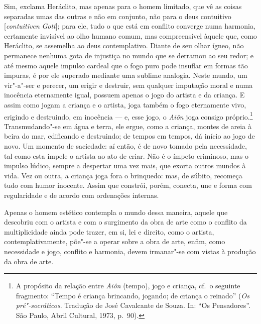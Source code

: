 Sim, exclama Heráclito, mas apenas para o homem limitado, que vê as coisas
separadas umas das outras e não em conjunto, não para o deus contuitivo
[\textit{contuitiven} \textit{Gott}]; para ele, tudo o que está em conflito
converge numa harmonia, certamente invisível ao olho humano comum, mas
compreensível àquele que, como Heráclito, se assemelha ao deus contemplativo.
Diante de seu olhar ígneo, não permanece nenhuma gota de injustiça no mundo
que se derramou ao seu redor; e até mesmo aquele impulso cardeal que o fogo
puro pode insuflar em formas tão impuras, é por ele superado mediante uma
sublime analogia. Neste mundo, um vir"-a"-ser e perecer, um erigir e
destruir, sem qualquer imputação moral e numa inocência eternamente igual,
possuem apenas o jogo do artista e da criança. E assim como jogam a criança e
o artista, joga também o fogo eternamente vivo, erigindo e destruindo, em
inocência --- e, esse jogo, o \textit{Aiôn} joga consigo próprio.\footnote{A propósito 
da relação entre \textit{Aiôn} (tempo), jogo e criança, cf.~o seguinte fragmento:
 ``Tempo é criança brincando, jogando; de criança o reinado'' (\textit
 {Os pré"-socráticos}. Tradução de José Cavalcante de Souza. In: ``Os
 Pensadores''. São Paulo, Abril Cultural, 1973, p.~90).} Transmudando"-se em
 água e terra, ele ergue, como a criança, montes de areia à beira do mar,
 edificando e destruindo; de tempos em tempos, dá início ao jogo de novo. Um
 momento de saciedade: aí então, é de novo tomado pela necessidade, tal como
 esta impele o artista ao ato de criar. Não é o ímpeto criminoso, mas o
 impulso lúdico, sempre a despertar uma vez mais, que exorta outros mundos à
 vida. Vez ou outra, a criança joga fora o brinquedo: mas, de súbito,
 recomeça tudo com humor inocente. Assim que constrói, porém, conecta, une e
 forma com regularidade e de acordo com ordenações internas.

Apenas o homem estético contempla o mundo dessa maneira, aquele que descobriu
com o artista e com o surgimento da obra de arte como o conflito da
multiplicidade ainda pode trazer, em si, lei e direito, como o artista,
contemplativamente, põe"-se a operar sobre a obra de arte, enfim, como
necessidade e jogo, conflito e harmonia, devem irmanar"-se com vistas à
produção da obra de arte.

